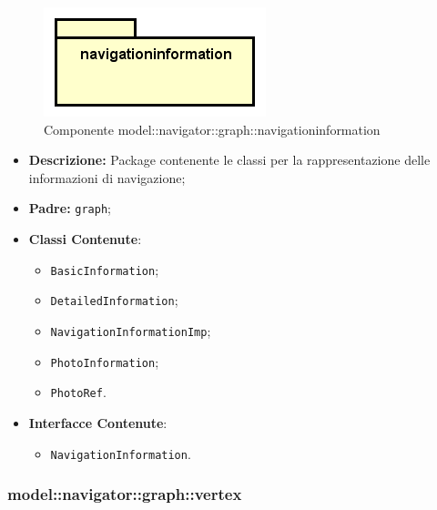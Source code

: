 \documentclass[../DefinizioneDiProdotto.tex]{subfiles}
\begin{document}
\begin{figure}[H]
	\centering
	\includegraphics[width=\maxwidth]{img/package/navigationinformation.png}
	\caption{Componente model::\-navigator::\-graph::\-navigationinformation}\label{fig:model::navigator::graph::navigationinformation} 
\end{figure}
\begin{itemize}
	\item \textbf{Descrizione:} Package contenente le classi per la rappresentazione delle informazioni di navigazione;
	\item \textbf{Padre:} \texttt{graph};
	\item \textbf{Classi Contenute}:
	\begin{itemize}
		\item \texttt{BasicInformation};
		
		\item \texttt{DetailedInformation};
		
		\item \texttt{NavigationInformationImp};
		
		\item \texttt{PhotoInformation};
		
		\item \texttt{PhotoRef}.
		
	\end{itemize}
	\item \textbf{Interfacce Contenute}:
	\begin{itemize}
		\item \texttt{NavigationInformation}.
		
	\end{itemize}
\end{itemize}

\subsubsection{model::\-navigator::\-graph::\-vertex}
\end{document}
